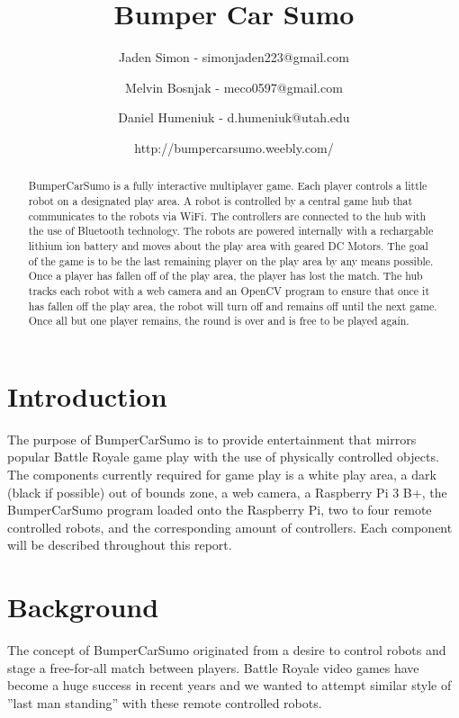 \documentclass[11pt]{ieeeconf}
\title{Bumper Car Sumo}
\author{Jaden Simon - simonjaden223@gmail.com \\ \and
	   Melvin Bosnjak - meco0597@gmail.com \\ \and
	   Daniel Humeniuk - d.humeniuk@utah.edu \\ \and
	   http://bumpercarsumo.weebly.com/}
\begin{document}
\maketitle

\begin{abstract}
BumperCarSumo is a fully interactive multiplayer game. Each player controls a little robot on a designated play area. A robot is controlled by a central game hub that communicates to the robots via WiFi. The controllers are connected to the hub with the use of Bluetooth technology. The robots are powered internally with a rechargable lithium ion battery and moves about the play area with geared DC Motors. The goal of the game is to be the last remaining player on the play area by any means possible. Once a player has fallen off of the play area, the player has lost the match. The hub tracks each robot with a web camera and an OpenCV program to ensure that once it has fallen off the play area, the robot will turn off and remains off until the next game. Once all but one player remains, the round is over and is free to be played again.
\end{abstract}

\section{Introduction}
The purpose of BumperCarSumo is to provide entertainment that mirrors popular Battle Royale game play with the use of physically controlled objects. The components currently required for game play is a white play area, a dark (black if possible) out of bounds zone, a web camera, a Raspberry Pi 3 B+, the BumperCarSumo program loaded onto the Raspberry Pi, two to four remote controlled robots, and the corresponding amount of controllers. Each component will be described throughout this report. 

\section{Background}


The concept of BumperCarSumo originated from a desire to control robots and stage a free-for-all match between players. Battle Royale video games have become a huge success in recent years and we wanted to attempt similar style of ''last man standing'' with these remote controlled robots.
\end{document}
